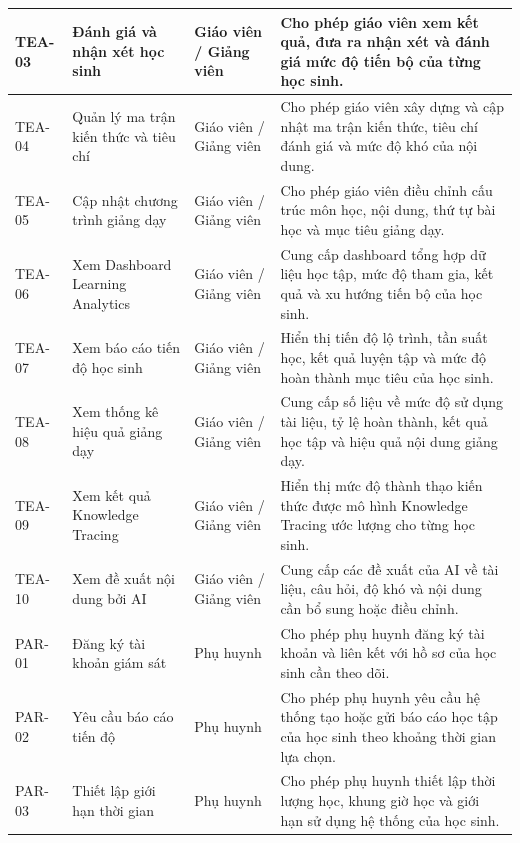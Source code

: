 \documentclass[12pt,a4paper,oneside]{report}
\begin{document}
\begin{longtable}{|p{}|p{}|p{}|p{}|}
TEA-03 &
Đánh giá và nhận xét học sinh &
Giáo viên / Giảng viên &
Cho phép giáo viên xem kết quả, đưa ra nhận xét và đánh giá mức độ tiến bộ của từng học sinh. \\
\hline

TEA-04 &
Quản lý ma trận kiến thức và tiêu chí &
Giáo viên / Giảng viên &
Cho phép giáo viên xây dựng và cập nhật ma trận kiến thức, tiêu chí đánh giá và mức độ khó của nội dung. \\
\hline

TEA-05 &
Cập nhật chương trình giảng dạy &
Giáo viên / Giảng viên &
Cho phép giáo viên điều chỉnh cấu trúc môn học, nội dung, thứ tự bài học và mục tiêu giảng dạy. \\
\hline

TEA-06 &
Xem Dashboard Learning Analytics &
Giáo viên / Giảng viên &
Cung cấp dashboard tổng hợp dữ liệu học tập, mức độ tham gia, kết quả và xu hướng tiến bộ của học sinh. \\
\hline

TEA-07 &
Xem báo cáo tiến độ học sinh &
Giáo viên / Giảng viên &
Hiển thị tiến độ lộ trình, tần suất học, kết quả luyện tập và mức độ hoàn thành mục tiêu của học sinh. \\
\hline

TEA-08 &
Xem thống kê hiệu quả giảng dạy &
Giáo viên / Giảng viên &
Cung cấp số liệu về mức độ sử dụng tài liệu, tỷ lệ hoàn thành, kết quả học tập và hiệu quả nội dung giảng dạy. \\
\hline

TEA-09 &
Xem kết quả Knowledge Tracing &
Giáo viên / Giảng viên &
Hiển thị mức độ thành thạo kiến thức được mô hình Knowledge Tracing ước lượng cho từng học sinh. \\
\hline

TEA-10 &
Xem đề xuất nội dung bởi AI &
Giáo viên / Giảng viên &
Cung cấp các đề xuất của AI về tài liệu, câu hỏi, độ khó và nội dung cần bổ sung hoặc điều chỉnh. \\
\hline

PAR-01 &
Đăng ký tài khoản giám sát &
Phụ huynh &
Cho phép phụ huynh đăng ký tài khoản và liên kết với hồ sơ của học sinh cần theo dõi. \\
\hline

PAR-02 &
Yêu cầu báo cáo tiến độ &
Phụ huynh &
Cho phép phụ huynh yêu cầu hệ thống tạo hoặc gửi báo cáo học tập của học sinh theo khoảng thời gian lựa chọn. \\
\hline

PAR-03 &
Thiết lập giới hạn thời gian &
Phụ huynh &
Cho phép phụ huynh thiết lập thời lượng học, khung giờ học và giới hạn sử dụng hệ thống của học sinh. \\
\hline


\end{longtable}
\end{document}

